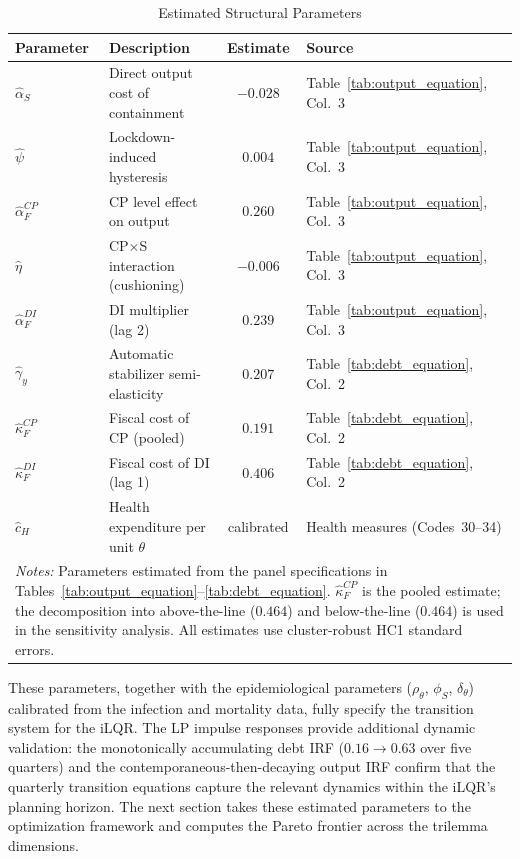 \documentclass[12pt, a4paper]{article}
\begin{document}
\begin{table}[htbp]
\centering
\caption{Estimated Structural Parameters}
\label{tab:structural_params}
\small
\begin{tabular}{llcl}
\toprule
\textbf{Parameter} & \textbf{Description} & \textbf{Estimate} & \textbf{Source} \\
\midrule
$\hat{\alpha}_S$        & Direct output cost of containment        & $-0.028$          & Table~\ref{tab:output_equation}, Col.~3 \\
$\hat{\psi}$            & Lockdown-induced hysteresis               & $0.004$           & Table~\ref{tab:output_equation}, Col.~3 \\
$\hat{\alpha}_F^{CP}$   & CP level effect on output                & $0.260$           & Table~\ref{tab:output_equation}, Col.~3 \\
$\hat{\eta}$            & CP$\times$S interaction (cushioning)      & $-0.006$          & Table~\ref{tab:output_equation}, Col.~3 \\
$\hat{\alpha}_F^{DI}$   & DI multiplier (lag 2)                    & $0.239$           & Table~\ref{tab:output_equation}, Col.~3 \\
$\hat{\gamma}_y$        & Automatic stabilizer semi-elasticity      & $0.207$           & Table~\ref{tab:debt_equation}, Col.~2 \\
$\hat{\kappa}_F^{CP}$   & Fiscal cost of CP (pooled)               & $0.191$           & Table~\ref{tab:debt_equation}, Col.~2 \\
$\hat{\kappa}_F^{DI}$   & Fiscal cost of DI (lag 1)                & $0.406$           & Table~\ref{tab:debt_equation}, Col.~2 \\
$\hat{c}_H$             & Health expenditure per unit $\theta$     & calibrated        & Health measures (Codes~30--34) \\
\bottomrule
\multicolumn{4}{p{13cm}}{\footnotesize \textit{Notes:} Parameters estimated from the panel specifications in Tables~\ref{tab:output_equation}--\ref{tab:debt_equation}. $\hat{\kappa}_F^{CP}$ is the pooled estimate; the decomposition into above-the-line ($0.464$) and below-the-line ($0.464$) is used in the sensitivity analysis. All estimates use cluster-robust HC1 standard errors.}
\end{tabular}
\end{table}

These parameters, together with the epidemiological parameters ($\rho_\theta$, $\phi_S$, $\delta_\theta$) calibrated from the infection and mortality data, fully specify the transition system for the iLQR. The LP impulse responses provide additional dynamic validation: the monotonically accumulating debt IRF ($0.16 \to 0.63$ over five quarters) and the contemporaneous-then-decaying output IRF confirm that the quarterly transition equations capture the relevant dynamics within the iLQR's planning horizon. The next section takes these estimated parameters to the optimization framework and computes the Pareto frontier across the trilemma dimensions.
\end{document}
